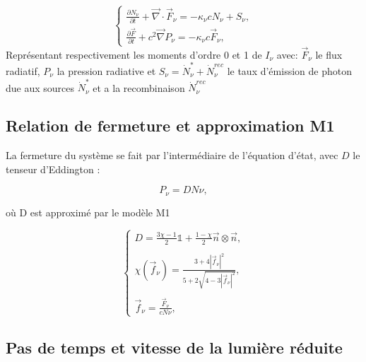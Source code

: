 \begin{equation}
\begin{cases}

\frac{ \partial N_\nu }{ \partial t } + \vec{\nabla} \cdot \vec{F}_\nu = -\kappa_\nu c  N_\nu + S_\nu,\\

\frac{ \partial \vec{F} }{ \partial t } + c^2 \vec{\nabla} P_\nu = -\kappa_\nu c \vec{F}_\nu ,

\end{cases}
\label{eq:densite_energie}
\end{equation}
Représentant respectivement les moments d'ordre 0 et 1 de $I_\nu$ avec:
$\vec{F}_\nu$ le flux radiatif, 
$P_\nu $ la pression radiative
et $S_\nu = \dot{N}_\nu^* + \dot{N}_\nu^{rec}$ le taux d’émission de photon due aux sources $\dot{N}_\nu^*$ et a la recombinaison $ \dot{N}_\nu^{rec}$


\subsection{Relation de fermeture et approximation M1}
La fermeture du système se fait par l’intermédiaire de l’équation d’état, avec $D$ le tenseur d’Eddington :

\begin{equation}
 P_\nu = D N\nu ,
\label{eq:fermeture}
\end{equation}

où D est approximé par le modèle M1 \citep{levermore_relating_1984}%

\begin{equation}
\begin{cases}

D = \frac{ 3\chi -1 }{2} \mathbb{1} + \frac{ 1 - \chi }{2} \vec{n} \otimes \vec{n} , \\
\\
\chi(\vec{f}_\nu) = \frac{ 3+4 |\vec{f}_\nu|^2 }{5+2\sqrt{4-3|\vec{f}_\nu|^2}} , \\
\\
\vec{f}_\nu = \frac{ \vec{F}_\nu }{c N\nu }  ,

\end{cases}
\label{eq:tenseur}
\end{equation}


\subsection{Pas de temps et vitesse de la lumière réduite}

